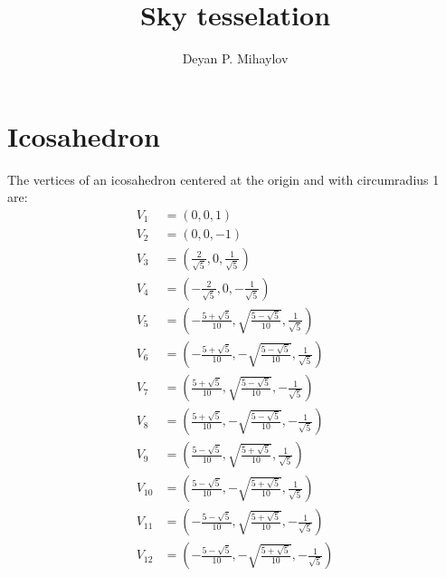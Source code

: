 \documentclass[author-year, prd, amsmath, amssymb, longbibliography, floatfix, reprint, superscriptaddress, a4]{revtex4-1}
\begin{document}

\title[Sky tesselation]{Sky tesselation}

\author{Deyan P. Mihaylov}

\maketitle

\section{Icosahedron}
The vertices of an icosahedron centered at the origin and with circumradius 1 are:
\begin{subequations}
    \begin{align}
    V_{1} &= (0, 0, 1) \\
    V_{2} &= (0, 0, -1) \\
    V_{3} &= \left(\frac{2}{\sqrt{5}}, 0, \frac{1}{\sqrt{5}}\right) \\
    V_{4} &= \left(-\frac{2}{\sqrt{5}}, 0, -\frac{1}{\sqrt{5}}\right) \\
    V_{5} &= \left(-\frac{5+\sqrt{5}}{10}, \sqrt{\frac{5-\sqrt{5}}{10}}, \frac{1}{\sqrt{5}}\right) \\
    V_{6} &= \left(-\frac{5+\sqrt{5}}{10}, -\sqrt{\frac{5-\sqrt{5}}{10}}, \frac{1}{\sqrt{5}}\right) \\
    V_{7} &= \left(\frac{5+\sqrt{5}}{10}, \sqrt{\frac{5-\sqrt{5}}{10}}, -\frac{1}{\sqrt{5}}\right) \\
    V_{8} &= \left(\frac{5+\sqrt{5}}{10}, -\sqrt{\frac{5-\sqrt{5}}{10}}, -\frac{1}{\sqrt{5}}\right) \\
    V_{9} &= \left(\frac{5-\sqrt{5}}{10}, \sqrt{\frac{5+\sqrt{5}}{10}}, \frac{1}{\sqrt{5}}\right) \\
    V_{10} &= \left(\frac{5-\sqrt{5}}{10}, -\sqrt{\frac{5+\sqrt{5}}{10}}, \frac{1}{\sqrt{5}}\right) \\
    V_{11} &= \left(-\frac{5-\sqrt{5}}{10}, \sqrt{\frac{5+\sqrt{5}}{10}}, -\frac{1}{\sqrt{5}}\right) \\
    V_{12} &= \left(-\frac{5-\sqrt{5}}{10}, -\sqrt{\frac{5+\sqrt{5}}{10}}, -\frac{1}{\sqrt{5}}\right)
    \end{align}
\end{subequations}
\end{document}
